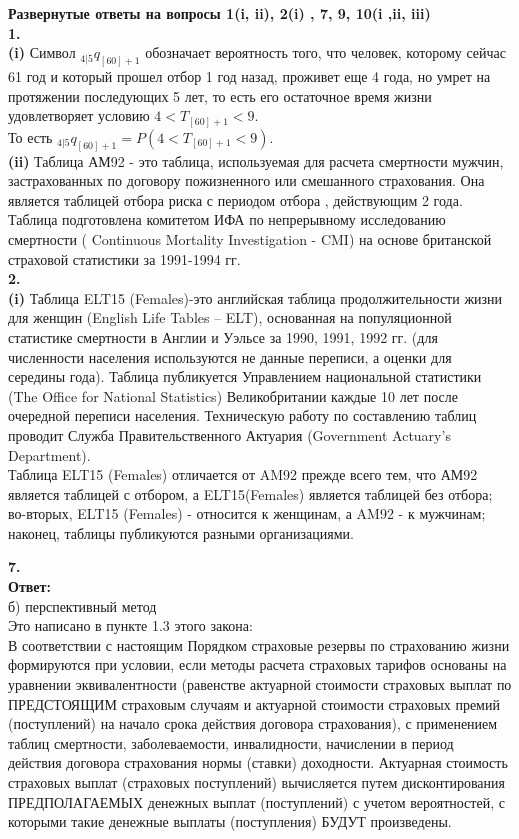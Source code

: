 \documentclass{article}
\begin{document}
{\bf Развернутые ответы на вопросы 1(i, ii), 2(i) , 7, 9, 10(i ,ii, iii) }\\

{\bf \large1.}\\
{\bf \large  (i)}  Символ  $_{4|5}q_{[60]+1} $ обозначает вероятность того, что человек, которому сейчас 61 год и который прошел отбор 1 год назад, проживет еще 4 года, но умрет на протяжении последующих 5 лет, то есть его остаточное время жизни удовлетворяет условию $4 < T_{[60]+1} < 9$. \\
То есть $_{4|5}q_{[60]+1} = P(4 < T_{[60]+1} < 9) $.\\
{\bf \large  (ii)} Таблица АМ92 - это таблица, используемая для расчета смертности мужчин, застрахованных по договору пожизненного или смешанного страхования. Она является таблицей отбора риска с периодом отбора , действующим 2 года. Таблица подготовлена комитетом ИФА по непрерывному исследованию смертности ( Continuous Mortality Investigation - CMI) на основе британской страховой статистики за 1991-1994 гг.\\

{\bf \large2.}\\
{\bf \large  (i)} Таблица ELT15 (Females)-это английская таблица продолжительности жизни  для женщин (English Life Tables – ELT),
основанная на популяционной статистике смертности в Англии и Уэльсе за 1990, 1991, 1992 гг. (для численности населения используются не данные переписи, а оценки для середины года).  Таблица публикуется Управлением национальной статистики (The Office for National Statistics) Великобритании каждые 10 лет после очередной переписи населения. Техническую работу по составлению таблиц проводит Служба Правительственного Актуария (Government Actuary’s Department).\\
Таблица  ELT15 (Females) отличается от AM92 прежде всего тем, что АМ92 является таблицей с отбором, а ELT15(Females) является таблицей без отбора; 
во-вторых, ELT15 (Females) - относится к женщинам, а AM92 - к мужчинам; наконец, таблицы публикуются разными организациями.


{\bf \large7.}\\
{\bf \large Ответ:}\\ б) перспективный метод\\
Это написано в пункте 1.3 этого закона:\\
 В соответствии с настоящим Порядком страховые резервы по страхованию жизни формируются при условии, если методы расчета страховых тарифов основаны на уравнении эквивалентности (равенстве актуарной стоимости страховых выплат по ПРЕДСТОЯЩИМ  страховым случаям и актуарной стоимости страховых премий (поступлений) на начало срока действия договора страхования), с применением таблиц смертности, заболеваемости, инвалидности, начислении в период действия договора страхования нормы (ставки) доходности. Актуарная стоимость страховых выплат (страховых поступлений) вычисляется путем дисконтирования ПРЕДПОЛАГАЕМЫХ денежных выплат (поступлений) с учетом вероятностей, с которыми такие денежные выплаты (поступления) БУДУТ произведены.\\
\end{document}

